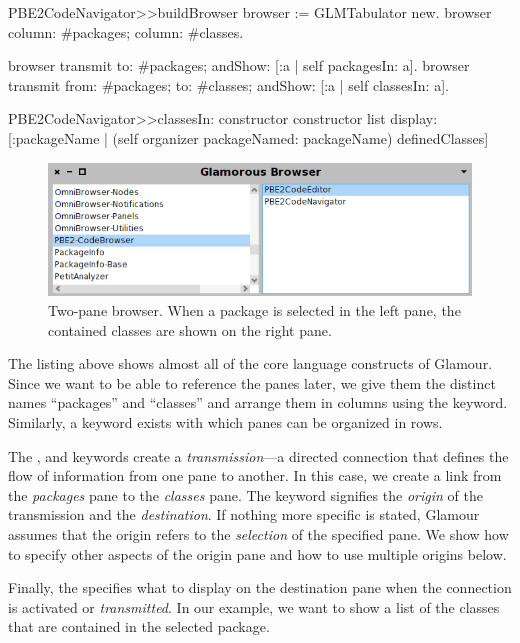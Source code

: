 \documentclass[a4paper,10pt,twoside]{book}
\begin{document}
\begin{code}{}
PBE2CodeNavigator>>buildBrowser
  browser := GLMTabulator new.
  browser
    column: #packages;
    column: #classes.

  browser transmit to: #packages; andShow: [:a | self packagesIn: a].
  browser transmit from: #packages; to: #classes; andShow: [:a | self classesIn: a].

PBE2CodeNavigator>>classesIn: constructor
  constructor list
    display: [:packageName | (self organizer packageNamed: packageName) definedClasses]
\end{code}

\begin{figure}[htbp]
  \centerline{\includegraphics[width=\linewidth]{showclasses.png}}
  \caption{Two-pane browser. When a package is selected in the left
    pane, the contained classes are shown on the right pane.}
  \label{fig:showclasses}
\end{figure}

The listing above shows almost all of the core language constructs of
Glamour. Since we want to be able to reference the panes later, we
give them the distinct names ``packages'' and ``classes'' and arrange them
in columns using the  keyword. Similarly, a 
keyword exists with which panes can be organized in rows.

The ,  and  keywords create a
\emph{transmission}---a directed connection that defines the flow of
information from one pane to another. In this case, we create a link
from the \emph{packages} pane to the \emph{classes} pane. The
 keyword signifies the \emph{origin} of the transmission and
 the \emph{destination}. If nothing more specific is stated,
Glamour assumes that the origin refers to the \emph{selection} of the
specified pane. We show how to specify other aspects of the origin
pane and how to use multiple origins below.

Finally, the  specifies what to display on the destination
pane when the connection is activated or \emph{transmitted}. In our
example, we want to show a list of the classes that are contained in
the selected package.
\end{document}
